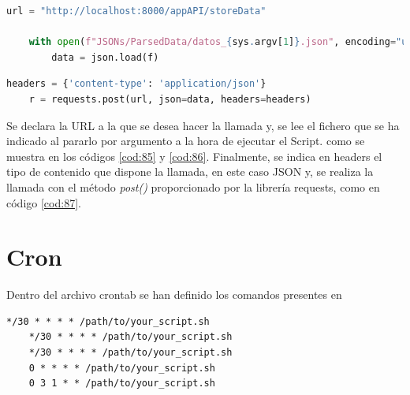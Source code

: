 \begin{lstlisting}[language=Python, caption={Declaración variables data\_post.py}, label=cod:86]
	url = "http://localhost:8000/appAPI/storeData"
	
	with open(f"JSONs/ParsedData/datos_{sys.argv[1]}.json", encoding="utf-8") as f:
		data = json.load(f)
\end{lstlisting}

\begin{lstlisting}[language=Python, caption={Llamada POST}, label=cod:87]
	headers = {'content-type': 'application/json'}
	r = requests.post(url, json=data, headers=headers)
\end{lstlisting}

Se declara la URL a la que se desea hacer la llamada y, se lee el fichero que se ha indicado al pararlo por argumento a la hora de ejecutar el Script. como se muestra en los códigos \ref{cod:85} y \ref{cod:86}. Finalmente, se indica en headers el tipo de contenido que dispone la llamada, en este caso JSON y, se realiza la llamada con el método \textit{post()} proporcionado por la librería requests, como en código \ref{cod:87}.

\section{Cron}
Dentro del archivo crontab se han definido los comandos presentes en 

\begin{lstlisting}[caption={Trabajos configurados para ser ejecutados por Cron}, label=cod:103]
	*/30 * * * * /path/to/your_script.sh
	*/30 * * * * /path/to/your_script.sh
	*/30 * * * * /path/to/your_script.sh
	0 * * * * /path/to/your_script.sh
	0 3 1 * * /path/to/your_script.sh
\end{lstlisting}